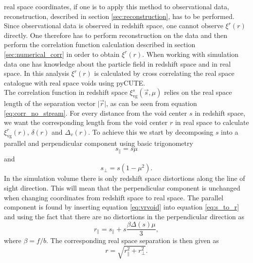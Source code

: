 real space coordinates, if one is to apply this method to observational data,
reconstruction, described in section \ref{sec:reconstruction}, has to be performed. Since observational data is observed in
redshift space, one cannot observe $\xi^r(r)$ directly. One therefore has to
perform reconstruction on the data and then perform the correlation function
calculation described in section \ref{sec:numerical_corr} in order to obtain
$\xi^r(r)$. When working with simulation data one has knowledge about the
particle field in redshift space and in real space. In this analysis $\xi^r(r)$ is calculated by cross correlating the real space catalogue with real space voids using pyCUTE. 
\\\indent
The correlation function in redshift space $\xi^s_{\mathrm{vg}}(\vec{s},\mu)$
relies on the real space length of the separation vector $\vert\vec{r}\vert$, as
can be seen from equation \ref{eq:corr_no_stream}. For every distance from the void center $s$ in
redshift space, we want the corresponding length from the void center $r$ in
real space to calculate $\xi^r_{\mathrm{vg}}(r)$, $\delta(r)$ and $\Delta_v(r)$.
To achieve this we start by decomposing $s$ into a parallel and perpendicular
component using basic trigonometry
\begin{equation}
    s_\parallel=s\mu
\end{equation}
and
\begin{equation}
    s_\perp=s(1-\mu^2).
\end{equation}
In the simulation volume there is only redshift space distortions along the line
of sight direction. This will mean that the perpendicular component is unchanged
when changing coordinates from redshift space to real space. The parallel
component is found by inserting equation \ref{eq:vrvoid} into equation \ref{eq:s_to_r} and using the fact that there are no distortions in the perpendicular direction as
\begin{equation}
    r_\parallel=s_\parallel + s\frac{\beta\Delta(s)\mu}{3},
\end{equation}
where $\beta=f/b$.
The corresponding real space separation is then given as
\begin{equation}
    r=\sqrt{r_\parallel^2+r_\perp^2}.
\end{equation}
